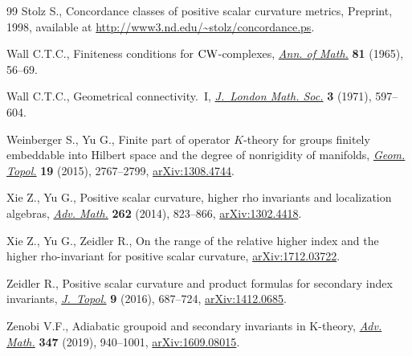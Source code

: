 \begin{thebibliography}{99}
Stolz S., Concordance classes of positive scalar curvature metrics, {P}reprint,
 1998, available at \url{http://www3.nd.edu/~stolz/concordance.ps}.

Wall C.T.C., Finiteness conditions for {${\rm CW}$}-complexes, \href{https://doi.org/10.2307/1970382}{\textit{Ann. of
 Math.}} \textbf{81} (1965), 56--69.

Wall C.T.C., Geometrical connectivity.~{I}, \href{https://doi.org/10.1112/jlms/s2-3.4.597}{\textit{J.~London Math. Soc.}}
 \textbf{3} (1971), 597--604.

Weinberger S., Yu G., Finite part of operator {$K$}-theory for groups finitely
 embeddable into {H}ilbert space and the degree of nonrigidity of manifolds,
 \href{https://doi.org/10.2140/gt.2015.19.2767}{\textit{Geom. Topol.}} \textbf{19} (2015), 2767--2799, \href{https://arxiv.org/abs/1308.4744}{arXiv:1308.4744}.

Xie Z., Yu G., Positive scalar curvature, higher rho invariants and
 localization algebras, \href{https://doi.org/10.1016/j.aim.2014.06.001}{\textit{Adv. Math.}} \textbf{262} (2014), 823--866,
 \href{https://arxiv.org/abs/#2}{arXiv:1302.4418}.

Xie Z., Yu G., Zeidler R., On the range of the relative higher index and the
 higher rho-invariant for positive scalar curvature, \href{https://arxiv.org/abs/1712.03722}{arXiv:1712.03722}.

Zeidler R., Positive scalar curvature and product formulas for secondary index
 invariants, \href{https://doi.org/10.1112/jtopol/jtw005}{\textit{J.~Topol.}} \textbf{9} (2016), 687--724,
 \href{https://arxiv.org/abs/1412.0685}{arXiv:1412.0685}.

Zenobi V.F., Adiabatic groupoid and secondary invariants in {K}-theory,
 \href{https://doi.org/10.1016/j.aim.2019.03.003}{\textit{Adv. Math.}} \textbf{347} (2019), 940--1001, \href{https://arxiv.org/abs/1609.08015}{arXiv:1609.08015}.

\end{thebibliography}
